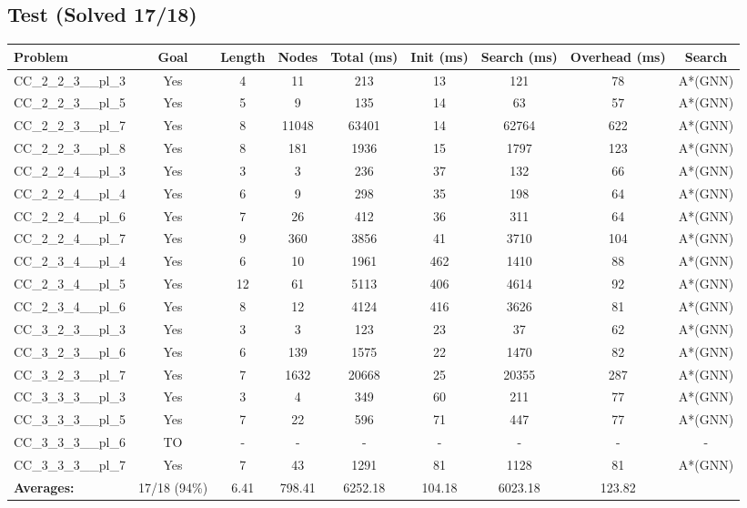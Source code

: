 \documentclass{article}
\begin{document}
\subsection*{Test (Solved 17/18)}
\begin{tabular}{lcccccccc}
\toprule
Problem & Goal & Length & Nodes & Total (ms) & Init (ms) & Search (ms) & Overhead (ms) & Search \\
\midrule
CC\_2\_2\_3\_\_pl\_3 & Yes & 4 & 11 & 213 & 13 & 121 & 78 & A*(GNN) \\
CC\_2\_2\_3\_\_pl\_5 & Yes & 5 & 9 & 135 & 14 & 63 & 57 & A*(GNN) \\
CC\_2\_2\_3\_\_pl\_7 & Yes & 8 & 11048 & 63401 & 14 & 62764 & 622 & A*(GNN) \\
CC\_2\_2\_3\_\_pl\_8 & Yes & 8 & 181 & 1936 & 15 & 1797 & 123 & A*(GNN) \\
CC\_2\_2\_4\_\_pl\_3 & Yes & 3 & 3 & 236 & 37 & 132 & 66 & A*(GNN) \\
CC\_2\_2\_4\_\_pl\_4 & Yes & 6 & 9 & 298 & 35 & 198 & 64 & A*(GNN) \\
CC\_2\_2\_4\_\_pl\_6 & Yes & 7 & 26 & 412 & 36 & 311 & 64 & A*(GNN) \\
CC\_2\_2\_4\_\_pl\_7 & Yes & 9 & 360 & 3856 & 41 & 3710 & 104 & A*(GNN) \\
CC\_2\_3\_4\_\_pl\_4 & Yes & 6 & 10 & 1961 & 462 & 1410 & 88 & A*(GNN) \\
CC\_2\_3\_4\_\_pl\_5 & Yes & 12 & 61 & 5113 & 406 & 4614 & 92 & A*(GNN) \\
CC\_2\_3\_4\_\_pl\_6 & Yes & 8 & 12 & 4124 & 416 & 3626 & 81 & A*(GNN) \\
CC\_3\_2\_3\_\_pl\_3 & Yes & 3 & 3 & 123 & 23 & 37 & 62 & A*(GNN) \\
CC\_3\_2\_3\_\_pl\_6 & Yes & 6 & 139 & 1575 & 22 & 1470 & 82 & A*(GNN) \\
CC\_3\_2\_3\_\_pl\_7 & Yes & 7 & 1632 & 20668 & 25 & 20355 & 287 & A*(GNN) \\
CC\_3\_3\_3\_\_pl\_3 & Yes & 3 & 4 & 349 & 60 & 211 & 77 & A*(GNN) \\
CC\_3\_3\_3\_\_pl\_5 & Yes & 7 & 22 & 596 & 71 & 447 & 77 & A*(GNN) \\
CC\_3\_3\_3\_\_pl\_6 & TO & - & - & - & - & - & - & - \\
CC\_3\_3\_3\_\_pl\_7 & Yes & 7 & 43 & 1291 & 81 & 1128 & 81 & A*(GNN) \\
\textbf{Averages:} & 17/18 (94\%) & 6.41 & 798.41 & 6252.18 & 104.18 & 6023.18 & 123.82 & \\
\bottomrule
\end{tabular}
\\[0.7cm]
\end{document}
